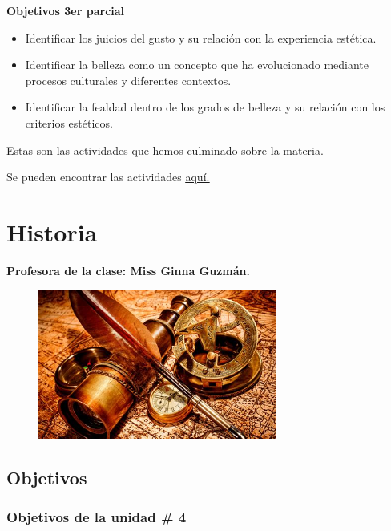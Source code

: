 \documentclass[a4paper, 12pt]{article}
\begin{document}
\textbf{Objetivos 3er parcial}

\begin{itemize}

  \item Identificar los juicios del gusto y su relación con la experiencia estética.
  \item Identificar la belleza como un concepto que ha evolucionado mediante procesos culturales y diferentes contextos.
  \item Identificar la fealdad dentro de los grados de belleza y su relación con los criterios estéticos.

\end{itemize}

Estas son las actividades que hemos culminado sobre la materia.

Se pueden encontrar las actividades \href{https://drive.google.com/drive/folders/1h1XjvVwmMZPTBrb_DGk4VFDaQa4U9lXx?usp=sharing}{\underline{aquí.}}

\section{Historia}

\textbf{Profesora de la clase: Miss Ginna Guzmán.}

\begin{figure}[h]
  \includegraphics[width=0.7\textwidth, center]{historia.jpeg}
\end{figure}

\subsection{Objetivos}

\subsubsection{Objetivos de la unidad \# 4}
\end{document}
